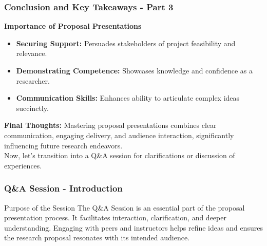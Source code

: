\documentclass[aspectratio=169]{beamer}
\begin{document}
\begin{frame}[fragile]
    \frametitle{Conclusion and Key Takeaways - Part 3}
    \textbf{Importance of Proposal Presentations}
    
    \begin{itemize}
        \item \textbf{Securing Support:} Persuades stakeholders of project feasibility and relevance.
        \item \textbf{Demonstrating Competence:} Showcases knowledge and confidence as a researcher.
        \item \textbf{Communication Skills:} Enhances ability to articulate complex ideas succinctly.
    \end{itemize}

    \textbf{Final Thoughts:} 
    Mastering proposal presentations combines clear communication, engaging delivery, and audience interaction, significantly influencing future research endeavors. 
    \\
    Now, let's transition into a Q\&A session for clarifications or discussion of experiences.
\end{frame}

\begin{frame}[fragile]
    \frametitle{Q\&A Session - Introduction}
    \begin{block}{Purpose of the Session}
        The Q\&A Session is an essential part of the proposal presentation process. It facilitates interaction, clarification, and deeper understanding. Engaging with peers and instructors helps refine ideas and ensures the research proposal resonates with its intended audience.
    \end{block}
\end{frame}
\end{document}
